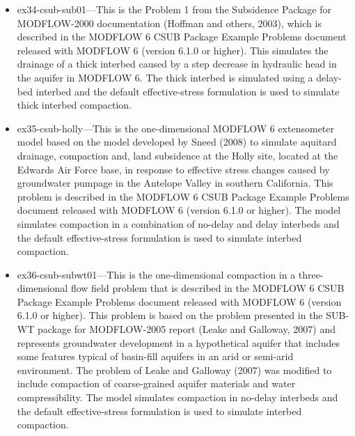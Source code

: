 \begin{itemize}
\item ex34-csub-sub01---This is the Problem 1 from the Subsidence Package for MODFLOW-2000 documentation (Hoffman and others, 2003), which is described in the MODFLOW 6 CSUB Package Example Problems document released with MODFLOW 6 (version 6.1.0 or higher).  This simulates the drainage of a thick interbed caused by a step decrease in hydraulic head in the aquifer in MODFLOW 6. The thick interbed is simulated using a delay-bed interbed and the default effective-stress formulation is used to simulate thick interbed compaction.
\item ex35-csub-holly---This is the one-dimensional MODFLOW 6 extensometer model based on the model developed by Sneed (2008) to simulate aquitard drainage, compaction and, land subsidence at the Holly site, located at the Edwards Air Force base, in response to effective stress changes caused by groundwater pumpage in the Antelope Valley in southern California. This problem is described in the MODFLOW 6 CSUB Package Example Problems document released with MODFLOW 6 (version 6.1.0 or higher). The model simulates compaction in a combination of no-delay and delay interbeds and the default effective-stress formulation is used to simulate interbed compaction.
\item ex36-csub-subwt01---This is the one-dimensional compaction in a three-dimensional flow field problem that is described in the MODFLOW 6 CSUB Package Example Problems document released with MODFLOW 6 (version 6.1.0 or higher). This problem is based on the problem presented in the SUB-WT package for MODFLOW-2005 report (Leake and Galloway, 2007) and represents groundwater development in a hypothetical aquifer that includes some features typical of basin-fill aquifers in an arid or semi-arid environment. The problem of Leake and Galloway (2007) was modified to include compaction of coarse-grained aquifer materials and water compressibility. The model simulates compaction in no-delay interbeds and the default effective-stress formulation is used to simulate interbed compaction.
\end{itemize}
